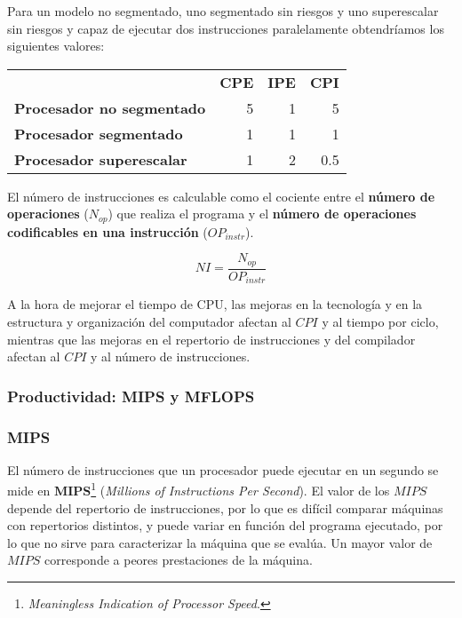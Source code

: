 Para un modelo no segmentado, uno segmentado sin riesgos y uno superescalar sin riesgos y capaz de ejecutar dos instrucciones paralelamente obtendríamos los siguientes valores:

\begin{center}
\begin{tabular}{l r r r}
	                                  & \textbf{CPE} & \textbf{IPE} & \textbf{CPI} \\
	\textbf{Procesador no segmentado} & 5            & 1            & 5 \\
	\textbf{Procesador segmentado}    & 1            & 1            & 1 \\
	\textbf{Procesador superescalar}  & 1            & 2            & 0.5 \\
\end{tabular}
\end{center}

El número de instrucciones es calculable como el cociente entre el \textbf{número de operaciones} ($N_{op}$) que realiza el programa y el \textbf{número de operaciones codificables en una instrucción} ($OP_{instr}$).

\[NI=\frac{N_{op}}{OP_{instr}}\]

A la hora de mejorar el tiempo de CPU, las mejoras en la tecnología y en la estructura y organización del computador afectan al $CPI$ y al tiempo por ciclo, mientras que las mejoras en el repertorio de instrucciones y del compilador afectan al $CPI$ y al número de instrucciones.

\subsubsection{Productividad: MIPS y MFLOPS}

\subsubsection{MIPS}

El número de instrucciones que un procesador puede ejecutar en un segundo se mide en $\boldsymbol{MIPS}$\footnote{\textit{Meaningless Indication of Processor Speed}.} (\textit{Millions of Instructions Per Second}).
El valor de los $MIPS$ depende del repertorio de instrucciones, por lo que es difícil comparar máquinas con repertorios distintos, y puede variar en función del programa ejecutado, por lo que no sirve para caracterizar la máquina que se evalúa.
Un mayor valor de $MIPS$ corresponde a peores prestaciones de la máquina.

